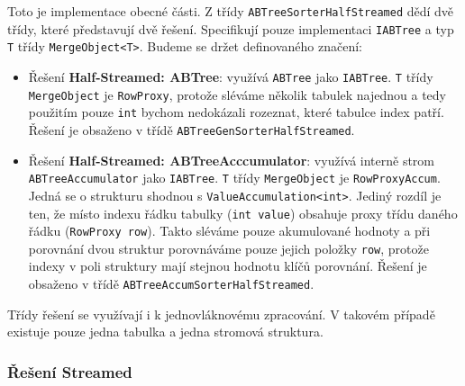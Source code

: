 Toto je implementace obecné části.
Z třídy \texttt{ABTreeSorterHalfStreamed} dědí dvě třídy, které představují dvě řešení.
Specifikují pouze implementaci \texttt{IABTree} a typ \texttt{T} třídy \texttt{MergeObject<T>}.
Budeme se držet definovaného značení:
\begin{itemize}
\item Řešení \textbf{Half-Streamed: ABTree}: využívá \texttt{ABTree} jako \texttt{IABTree}.
\texttt{T} třídy \texttt{MergeObject} je \texttt{RowProxy}, protože sléváme několik tabulek najednou a tedy použitím pouze \texttt{int} bychom nedokázali rozeznat, které tabulce index patří.
Řešení je obsaženo v třídě \texttt{ABTreeGenSorterHalfStreamed}.

\item Řešení \textbf{Half-Streamed: ABTreeAcccumulator}: využívá interně strom \texttt{ABTreeAccumulator} jako \texttt{IABTree}.
\texttt{T} třídy \texttt{MergeObject} je \texttt{RowProxyAccum}.
Jedná se o strukturu shodnou s \texttt{ValueAccumulation<int>}. 
Jediný rozdíl je ten, že místo indexu řádku tabulky (\texttt{int value}) obsahuje proxy třídu daného řádku (\texttt{RowProxy row}).
Takto sléváme pouze akumulované hodnoty a při porovnání dvou struktur porovnáváme pouze jejich položky \texttt{row}, protože indexy v poli struktury mají stejnou hodnotu klíčů porovnání.
Řešení je obsaženo v třídě \texttt{ABTreeAccumSorterHalfStreamed}.

\end{itemize}
Třídy řešení se využívají i k jednovláknovému zpracování.
V takovém případě existuje pouze jedna tabulka a jedna stromová struktura.

\subsubsection{Řešení Streamed}

